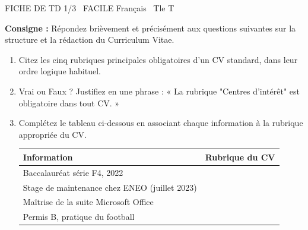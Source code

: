 \documentclass[11pt]{article}
\begin{document}
\begin{tcolorbox}[enhanced,colback=popink,colframe=popink,arc=10pt,boxrule=0pt,left=12pt,right=12pt,top=9pt,bottom=9pt]
{\color{white}\popxbold\small FICHE DE TD 1/3 \textbullet\ FACILE \hfill Français \textbullet\ Tle T\par}
\end{tcolorbox}
\vspace{4pt}
\textbf{Consigne :} Répondez brièvement et précisément aux questions suivantes sur la structure et la rédaction du Curriculum Vitae.

\begin{exercice}
\begin{enumerate}
    \item Citez les cinq rubriques principales obligatoires d'un CV standard, dans leur ordre logique habituel.
    \item Vrai ou Faux ? Justifiez en une phrase : « La rubrique "Centres d'intérêt" est obligatoire dans tout CV. »
    \item Complétez le tableau ci-dessous en associant chaque information à la rubrique appropriée du CV.
    
    \begin{tabular}{|p{5cm}|p{5cm}|}
    \hline
    \textbf{Information} & \textbf{Rubrique du CV} \\
    \hline
    Baccalauréat série F4, 2022 & \\
    \hline
    Stage de maintenance chez ENEO (juillet 2023) & \\
    \hline
    Maîtrise de la suite Microsoft Office & \\
    \hline
    Permis B, pratique du football & \\
    \hline
    \end{tabular}
\end{enumerate}
\end{exercice}
\end{document}
